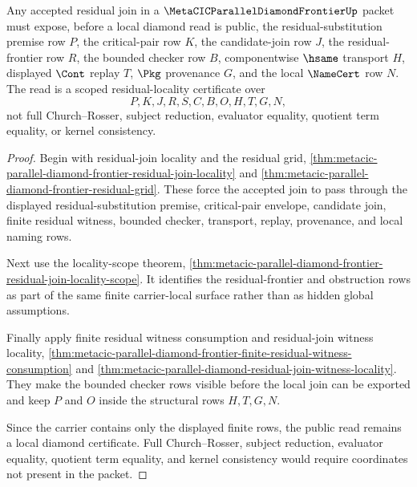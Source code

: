 \begin{theorem}
\label{thm:metacic-parallel-diamond-scoped-residual-locality}
Any accepted residual join in a $\MetaCICParallelDiamondFrontierUp$ packet must expose, before a local diamond read is public, the residual-substitution premise row $P$, the critical-pair row $K$, the candidate-join row $J$, the residual-frontier row $R$, the bounded checker row $B$, componentwise $\hsame$ transport $H$, displayed $\Cont$ replay $T$, $\Pkg$ provenance $G$, and the local $\NameCert$ row $N$. The read is a scoped residual-locality certificate over
$$
P,K,J,R,S,C,B,O,H,T,G,N ,
$$
not full Church--Rosser, subject reduction, evaluator equality, quotient term equality, or kernel consistency.
\end{theorem}
\begin{proof}
Begin with residual-join locality and the residual grid, \autoref{thm:metacic-parallel-diamond-frontier-residual-join-locality} and \autoref{thm:metacic-parallel-diamond-frontier-residual-grid}. These force the accepted join to pass through the displayed residual-substitution premise, critical-pair envelope, candidate join, finite residual witness, bounded checker, transport, replay, provenance, and local naming rows.

Next use the locality-scope theorem, \autoref{thm:metacic-parallel-diamond-frontier-residual-join-locality-scope}. It identifies the residual-frontier and obstruction rows as part of the same finite carrier-local surface rather than as hidden global assumptions.

Finally apply finite residual witness consumption and residual-join witness locality, \autoref{thm:metacic-parallel-diamond-frontier-finite-residual-witness-consumption} and \autoref{thm:metacic-parallel-diamond-residual-join-witness-locality}. They make the bounded checker rows visible before the local join can be exported and keep $P$ and $O$ inside the structural rows $H,T,G,N$.

Since the carrier contains only the displayed finite rows, the public read remains a local diamond certificate. Full Church--Rosser, subject reduction, evaluator equality, quotient term equality, and kernel consistency would require coordinates not present in the packet.
\end{proof}

